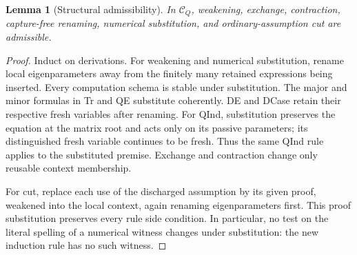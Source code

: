 \documentclass[11pt,letterpaper]{article}
\newtheorem{lemma}[theorem]{Lemma}
\theoremstyle{definition}\newtheorem{definition}[theorem]{Definition}
\theoremstyle{remark}\newtheorem{remark}[theorem]{Remark}
\newcommand{\CQ}{\mathcal C_Q}
\begin{document}
\begin{lemma}[Structural admissibility]
In $\CQ$, weakening, exchange, contraction, capture-free renaming,
numerical substitution, and ordinary-assumption cut are admissible.
\end{lemma}
\begin{proof}
Induct on derivations. For weakening and numerical substitution, rename
local eigenparameters away from the finitely many retained expressions
being inserted. Every computation schema is stable under substitution.
The major and minor formulas in Tr and QE substitute coherently. DE and
DCase retain their respective fresh variables after renaming.
For QInd, substitution preserves the equation at the matrix root and
acts only on its passive parameters; its distinguished fresh variable
continues to be fresh. Thus the same QInd rule applies to the substituted
premise. Exchange and contraction change only reusable context membership.

For cut, replace each use of the discharged assumption by its given proof,
weakened into the local context, again renaming eigenparameters first.
This proof substitution preserves every rule side condition. In
particular, no test on the literal spelling of a numerical witness changes
under substitution: the new induction rule has no such witness.
\end{proof}
\end{document}
